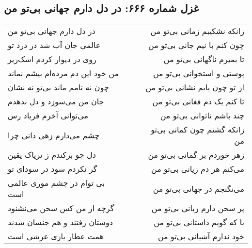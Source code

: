 \begin{center}
\section*{غزل شماره ۶۶۶: در دل دارم جهانی بی‌تو من}
\label{sec:666}
\begin{longtable}{l p{0.5cm} r}
در دل دارم جهانی بی‌تو من
&&
زانکه نشکیبم زمانی بی‌تو من
\\
عالمی جان آب شد در درد تو
&&
چون کنم با نیم جانی بی‌تو من
\\
روی در دیوار کردم اشک‌ریز
&&
تا بمیرم ناگهانی بی‌تو من
\\
من خود این دم مرده‌ام بیشم نماند
&&
پوستی و استخوانی بی‌تو من
\\
چون نه نامم ماند بی‌تو نه نشان
&&
از تو چون یابم نشانی بی‌تو من
\\
جان من می‌سوزد و دل ندهدم
&&
تا کنم یک دم فغانی بی‌تو من
\\
می‌توانی آخرم فریاد رس
&&
چند باشم ناتوانی بی‌تو من
\\
چشم می‌دارم زهی دانی چرا
&&
زانکه گشتم چون کمانی بی‌تو من
\\
دل چو برکندم ز تریاک یقین
&&
زهر خوردم بر گمانی بی‌تو من
\\
گر نکردم سود در سودای تو
&&
می‌کنم هر دم زیانی بی‌تو من
\\
بی توام در چشم موری عالمی است
&&
می‌نگنجم در جهانی بی‌تو من
\\
گرچه از من کس سخن می‌نشنود
&&
پر سخن دارم زبانی بی‌تو من
\\
دوستان رفتند و هم جنسان شدند
&&
با که گویم داستانی بی‌تو من
\\
همت عطار بازی عرشی است
&&
خود ندارم آشیانی بی‌تو من
\\
\end{longtable}
\end{center}
